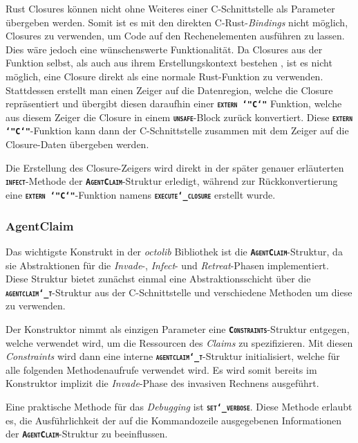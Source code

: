 Rust Closures können nicht ohne Weiteres einer C-Schnittstelle als Parameter übergeben werden.
Somit ist es mit den direkten C-Rust-\textit{Bindings} nicht möglich, Closures zu verwenden,
um Code auf den Rechenelementen ausführen zu lassen. Dies wäre jedoch eine
wünschenswerte Funktionalität. Da Closures aus der Funktion selbst, als auch aus ihrem
Erstellungskontext bestehen \cite{embeddedRustOS}, ist es nicht möglich,
eine Closure direkt als eine normale Rust-Funktion zu verwenden.
Stattdessen erstellt man einen Zeiger auf die Datenregion,
welche die Closure repräsentiert und übergibt diesen daraufhin einer
\texttt{\textsc{\textbf{extern \char`"C\char`"}}} Funktion, welche aus diesem Zeiger die Closure in einem
\texttt{\textsc{\textbf{unsafe}}}-Block zurück konvertiert.
Diese \texttt{\textsc{\textbf{extern \char`"C\char`"}}}-Funktion kann dann der C-Schnittstelle zusammen mit dem
Zeiger auf die Closure-Daten übergeben werden.

Die Erstellung des Closure-Zeigers wird direkt in der später genauer erläuterten
\texttt{\textsc{\textbf{infect}}}-Methode der \texttt{\textsc{\textbf{AgentClaim}}}-Struktur
erledigt, während zur Rückkonvertierung eine \texttt{\textsc{\textbf{extern \char`"C\char`"}}}-Funktion namens \texttt{\textsc{\textbf{execute\char`_closure}}} erstellt wurde.

\subsubsection{AgentClaim}

Das wichtigste Konstrukt in der \textit{octolib} Bibliothek ist die \texttt{\textsc{\textbf{AgentClaim}}}-Struktur,
da sie Abstraktionen für die \textit{Invade}-, \textit{Infect}- und \textit{Retreat}-Phasen implementiert.
Diese Struktur bietet zunächst einmal eine Abstraktionsschicht über die
\texttt{\textsc{\textbf{agentclaim\char`_t}}}-Struktur aus der C-Schnittstelle
und verschiedene Methoden um diese zu verwenden.

Der Konstruktor nimmt als einzigen Parameter eine \texttt{\textsc{\textbf{Constraints}}}-Struktur entgegen,
welche verwendet wird, um die Ressourcen des \textit{Claims} zu spezifizieren.
Mit diesen \textit{Constraints} wird dann eine interne
\texttt{\textsc{\textbf{agentclaim\char`_t}}}-Struktur initialisiert,
welche für alle folgenden Methodenaufrufe verwendet wird. Es wird somit bereits im Konstruktor implizit die
\textit{Invade}-Phase des invasiven Rechnens ausgeführt.

Eine praktische Methode für das \textit{Debugging} ist \texttt{\textsc{\textbf{set\char`_verbose}}}.
Diese Methode erlaubt es, die Ausführlichkeit der auf die Kommandozeile ausgegebenen Informationen der
\texttt{\textsc{\textbf{AgentClaim}}}-Struktur zu beeinflussen.

